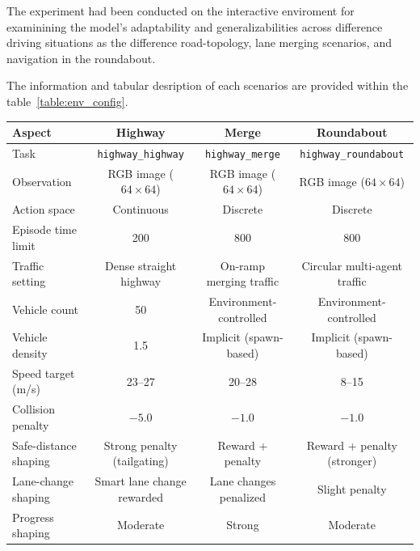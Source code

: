 The experiment had been conducted on the interactive enviroment for examinining the model's adaptability and generalizabilities across difference driving situations as the difference road-topology, lane merging scenarios, and navigation in the roundabout.

The information and tabular desription of each scenarios are provided within the table~\ref{table:env_config}.

\begin{table}
\centering
\small
\renewcommand{\arraystretch}{1.25}
\begin{tabular}{lccc}
\hline
\textbf{Aspect}
& \textbf{Highway}
& \textbf{Merge}
& \textbf{Roundabout} \\
\hline

Task
& \texttt{highway\_highway}
& \texttt{highway\_merge}
& \texttt{highway\_roundabout} \\

Observation
& RGB image ($64 \times 64$)
& RGB image ($64 \times 64$)
& RGB image ($64 \times 64$) \\

Action space
& Continuous
& Discrete
& Discrete \\

Episode time limit
& 200
& 800
& 800 \\

Traffic setting
& Dense straight highway
& On-ramp merging traffic
& Circular multi-agent traffic \\

Vehicle count
& 50
& Environment-controlled
& Environment-controlled \\

Vehicle density
& 1.5
& Implicit (spawn-based)
& Implicit (spawn-based) \\

Speed target (m/s)
& 23--27
& 20--28
& 8--15 \\

Collision penalty
& $-5.0$
& $-1.0$
& $-1.0$ \\

Safe-distance shaping
& Strong penalty (tailgating)
& Reward + penalty
& Reward + penalty (stronger) \\

Lane-change shaping
& Smart lane change rewarded
& Lane changes penalized
& Slight penalty \\

Progress shaping
& Moderate
& Strong
& Moderate \\


\end{tabular}
\end{table}
